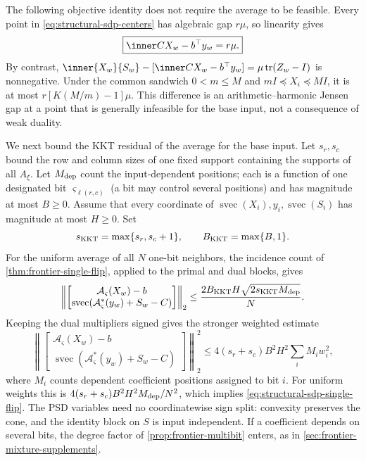 The following objective identity does not require the average to be
feasible.  Every point in
\eqref{eq:structural-sdp-centers} has algebraic gap $r\mu$, so linearity gives
\begin{equation}
 \boxed{\inner C{X_w}-b^\top y_w=r\mu.}                       \label{eq:structural-sdp-gap}
\end{equation}
By contrast,
$\inner{X_w}{S_w}-[\inner C{X_w}-b^\top y_w]
=\mu\tr(Z_w-I)$ is nonnegative.  Under the common sandwich
$0<m\leq M$ and $mI\preceq X_i\preceq MI$, it is at most
$r[K(M/m)-1]\mu$.  This difference is an arithmetic--harmonic Jensen gap at
a point that is generally infeasible for the base input, not a consequence
of weak duality.

We next bound the KKT residual of the average for the base input.  Let $s_r,s_c$ bound the row and column sizes of
one fixed support containing the supports of all $A_\xi$.  Let
$M_{\rm dep}$ count the input-dependent positions; each is a function of one
designated bit $\varsigma_{\ell(r,c)}$ (a bit may control several
positions) and has magnitude at most $B\geq0$.  Assume that every
coordinate of
$\operatorname{svec}(X_i),y_i,\operatorname{svec}(S_i)$ has magnitude at
most $H\geq0$.  Set
\begin{equation}
 s_{\rm KKT}=\max\{s_r,s_c+1\},\qquad
 B_{\rm KKT}=\max\{B,1\}.
\end{equation}
For the uniform average of all $N$ one-bit neighbors, the incidence count of
\cref{thm:frontier-single-flip}, applied to the primal and dual blocks,
gives
\begin{equation}
 \left\|
 \begin{bmatrix}
  \mathcal A_\varsigma(X_w)-b\\
  \operatorname{svec}(\mathcal A_\varsigma^*(y_w)+S_w-C)
 \end{bmatrix}\right\|_2
 \leq\frac{2B_{\rm KKT}H\sqrt{2s_{\rm KKT}M_{\rm dep}}}{N}.
                                                               \label{eq:structural-sdp-single-flip}
\end{equation}
Keeping the dual multipliers signed gives the stronger weighted estimate
\begin{equation}
 \left\|
 \begin{bmatrix}
  \mathcal A_\varsigma(X_w)-b\\
  \operatorname{svec}(\mathcal A_\varsigma^*(y_w)+S_w-C)
 \end{bmatrix}\right\|_2^2
 \leq4(s_r+s_c)B^2H^2\sum_i M_iw_i^2,
 \label{eq:structural-sdp-weighted-residual}
\end{equation}
where $M_i$ counts dependent coefficient positions assigned to bit $i$.
For uniform weights this is
$4(s_r+s_c)B^2H^2M_{\rm dep}/N^2$, which implies
\eqref{eq:structural-sdp-single-flip}.
The PSD variables need no coordinatewise sign split: convexity preserves the
cone, and the identity block on $S$ is input independent.
If a coefficient depends on several bits, the degree factor of
\cref{prop:frontier-multibit} enters, as in
\cref{sec:frontier-mixture-supplements}.

